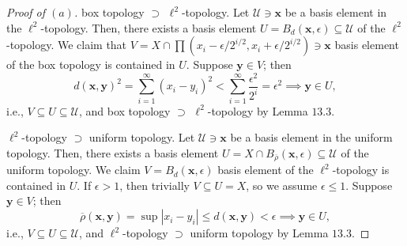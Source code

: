 \documentclass[12pt]{article}
\theoremstyle{remark}
\begin{document}
\begin{proof}[Proof of $(a)$]
  box topology $\supset$ $\ell^2$-topology. Let $\mathcal{U} \ni \mathbf{x}$ be a basis element in the $\ell^2$-topology. Then, there exists a basis element $U = B_d(\mathbf{x},\epsilon) \subseteq \mathcal{U}$ of the $\ell^2$-topology. We claim that $V = X \cap \prod (x_i-\epsilon/2^{i/2},x_i+\epsilon/2^{i/2}) \ni \mathbf{x}$ basis element of the box topology is contained in $U$. Suppose $\mathbf{y} \in V$; then
  \begin{equation*}
    d(\mathbf{x},\mathbf{y})^2 = \sum_{i=1}^\infty (x_i-y_i)^2 < \sum_{i=1}^\infty \frac{\epsilon^2}{2^i} = \epsilon^2 \implies \mathbf{y} \in U,
  \end{equation*}
  i.e., $V \subseteq U \subseteq \mathcal{U}$, and box topology $\supset$ $\ell^2$-topology by Lemma $13.3$.
  \par $\ell^2$-topology $\supset$ uniform topology. Let $\mathcal{U} \ni \mathbf{x}$ be a basis element in the uniform topology. Then, there exists a basis element $U = X \cap B_{\overline{\rho}}(\mathbf{x},\epsilon) \subseteq \mathcal{U}$ of the uniform topology. We claim $V = B_d(\mathbf{x},\epsilon)$ basis element of the $\ell^2$-topology is contained in $U$. If $\epsilon > 1$, then trivially $V \subseteq U = X$, so we assume $\epsilon \le 1$. Suppose $\mathbf{y} \in V$; then
  \begin{equation*}
    \overline{\rho}(\mathbf{x},\mathbf{y}) = \sup |x_i-y_i| \le d(\mathbf{x},\mathbf{y}) < \epsilon \implies \mathbf{y} \in U,
  \end{equation*}
  i.e., $V \subseteq U \subseteq \mathcal{U}$, and $\ell^2$-topology $\supset$ uniform topology by Lemma $13.3$.
\end{proof}
\end{document}
